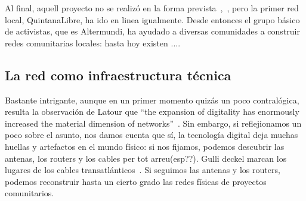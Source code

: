 \begin{comment}
2017
* Julio: el decreto de Macri llega al Corte Suprema, que aun ha de pronunciarse hacia su legalidad
* Octubre: planificado el lanzamiento del libre router
pliegues de redes comunitarias en Argentina

Las redes aquí enumeradas utilizan tecnología desarrollada por AlterMundi y reciben soporte y asistencia de parte de la Asociación.

QuintanaLibre, Córdoba, iniciada en Marzo de 2012 
DeltaLibre, Buenos Aires, iniciada en Abril de 2012 
AnisacateLibre, Córdoba, iniciada en Septiembre de 2012 
LaSerranitaLibre, Córdoba, iniciada en Septiembre de 2013 
NonoLibre, Córdoba, Iniciada en Marzo de 2014 
BoquerónLibre, Santiago del Estero, Abril de 2015 
LaBolsaLibre, Córdoba, iniciada en Mayo de 2015

Despliegues de redes comunitarias en el exterior

Fumaça Online, Río de Janeiro, Brasil, Julio de 2015
MulukukuLibre, Nicaragua, Enero de 2016
Caimito Libre, Esmeraldas, Febrero de 2017
\end{comment}

Al final, aquell proyecto no se realizó en la forma prevista~\autocite{Vaseva2016a},~\autocite{iv-nico-pillku}, pero la primer red local, QuintanaLibre, ha ido en linea igualmente.
Desde entonces el grupo básico de activistas, que es Altermundi, ha ayudado a diversas comunidades a construir redes comunitarias locales:
hasta hoy existen ....

\subsection{La red como infraestructura técnica}

Bastante intrigante, aunque en un primer momento quizás un poco contralógica, resulta la observación de Latour que ``the expansion of digitality has enormously increased the material dimension of networks''~\autocite{Latour2010}.
Sin embargo, si reflejionamos un poco sobre el asunto, nos damos cuenta que sí, la tecnología digital deja muchas huellas y artefactos en el mundo físico: si nos fijamos, podemos descubrir las antenas, los routers y los cables per tot arreu(esp??).
Gulli deckel marcan los lugares de los cables transatlánticos~\autocite{video internet landscapes}.
Si seguimos las antenas y los routers, podemos reconstruir hasta un cierto grado las redes físicas de proyectos comunitarios.


